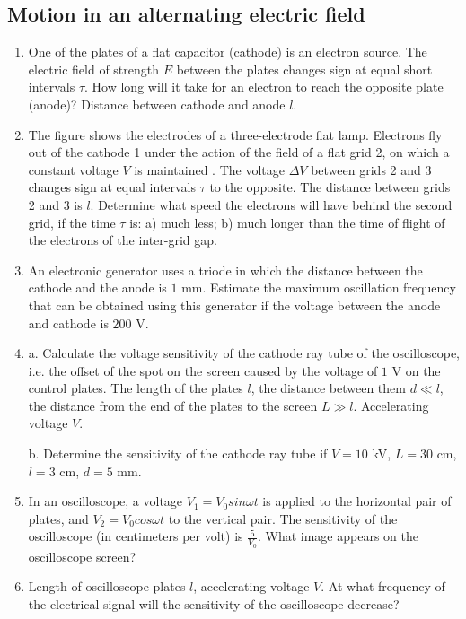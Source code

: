 \documentclass{article}
\begin{document}
\subsection{Motion in an alternating electric field}
\begin{enumerate}[label=7.3.\arabic*]


\item One of the plates of a flat capacitor (cathode) is an electron source. The electric field of strength $E$ between the plates changes sign at equal short intervals $\tau$. How long will it take for an electron to reach the opposite plate (anode)? Distance between cathode and anode $l$.

\item The figure shows the electrodes of a three-electrode flat lamp. Electrons fly out of the cathode 1 under the action of the field of a flat grid 2, on which a constant voltage $V$ is maintained . The voltage $\Delta V$ between grids 2 and 3 changes sign at equal intervals $\tau$ to the opposite. The distance between grids 2 and 3 is $l$. Determine what speed the electrons will have behind the second grid, if the time $\tau$ is: a) much less; b) much longer than the time of flight of the electrons of the inter-grid gap.

\item An electronic generator uses a triode in which the distance between the cathode and the anode is $1$ mm. Estimate the maximum oscillation frequency that can be obtained using this generator if the voltage between the anode and cathode is $200$ V.

\item a. Calculate the voltage sensitivity of the cathode ray tube of the oscilloscope, i.e. the offset of the spot on the screen caused by the voltage of $1$ V on the control plates. The length of the plates $l$, the distance between them $d \ll l$, the distance from the end of the plates to the screen $L \gg l$. Accelerating voltage $V$.

b. Determine the sensitivity of the cathode ray tube if $V = 10$ kV, $L = 30$ cm, $l = 3$ cm, $d = 5$ mm.

\item In an oscilloscope, a voltage $V_1 = V_0 sin \omega t$ is applied to the horizontal pair of plates, and $V_2 = V_0 cos \omega t$ to the vertical pair. The sensitivity of the oscilloscope (in centimeters per volt) is $\frac{5}{V_0}$. What image appears on the oscilloscope screen?

\item Length of oscilloscope plates $l$, accelerating voltage $V$. At what frequency of the electrical signal will the sensitivity of the oscilloscope decrease?


\end{enumerate}
\end{document}
